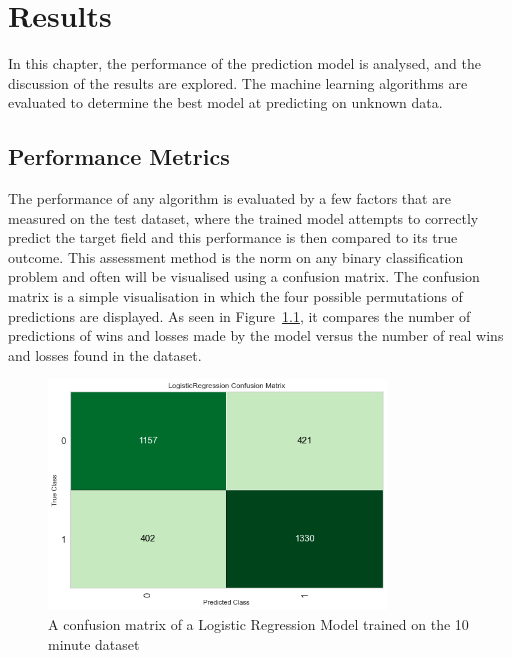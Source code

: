\chapter{Results}\label{ch:results}

In this chapter, the performance of the prediction model is analysed, and the discussion of the results are explored.
The machine learning algorithms are evaluated to determine the best model at predicting on unknown data.

\section{Performance Metrics}\label{sec:Performance Metrics}

The performance of any algorithm is evaluated by a few factors that are measured on the test dataset, where the trained model attempts to correctly predict the target field and this performance is then compared to its true outcome.
This assessment method is the norm on any binary classification problem and often will be visualised using a confusion matrix.
The confusion matrix is a simple visualisation in which the four possible permutations of predictions are displayed.
As seen in Figure~\ref{fig:ConfusionMatrix10}, it compares the number of predictions of wins and losses made by the model versus the number of real wins and losses found in the dataset. \\

\begin{figure}[h]
    \centering
    \includegraphics[width=0.8\textwidth]{figures/ConfusionMatrix10}
    \caption{A confusion matrix of a Logistic Regression Model trained on the 10 minute dataset}
    \label{fig:ConfusionMatrix10}
\end{figure}

